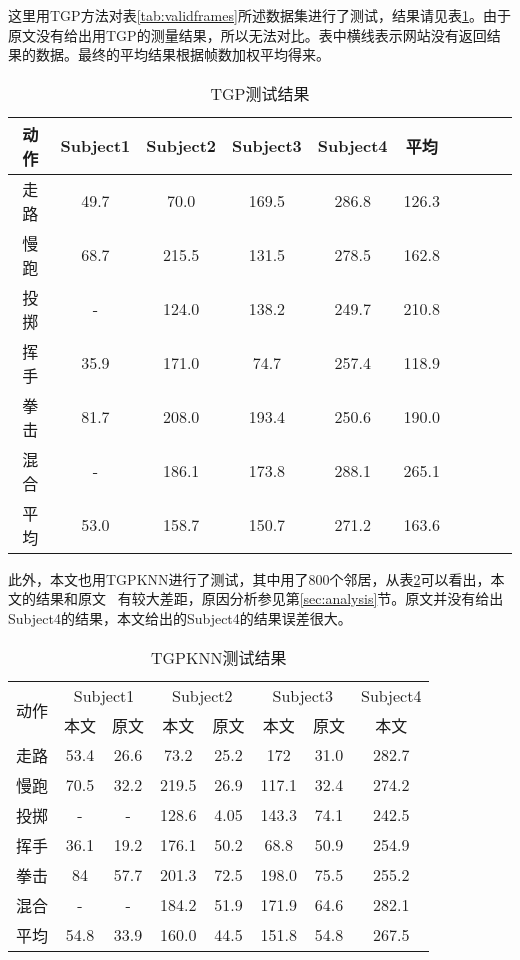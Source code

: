 这里用TGP方法对表\ref{tab:validframes}所述数据集进行了测试，结果请见表\ref{tab:TGPresult}。由于原文没有给出用TGP的测量结果，所以无法对比。表中横线表示网站没有返回结果的数据。最终的平均结果根据帧数加权平均得来。
\begin{table}[H]
  \centering
  \caption{TGP测试结果}
  \label{tab:TGPresult}
    \begin{tabular}{cccccccccc}
      \toprule[1.5pt]
      动作 & Subject1 & Subject2 & Subject3 & Subject4 & 平均 \\\midrule[1pt]
      走路 & 49.7& 70.0& 169.5& 286.8& 126.3\\
      慢跑 & 68.7& 215.5& 131.5& 278.5 & 162.8\\
      投掷 & - & 124.0& 138.2& 249.7 & 210.8\\
      挥手 & 35.9& 171.0& 74.7& 257.4 & 118.9\\
      拳击 & 81.7& 208.0& 193.4& 250.6 & 190.0\\
      混合 & - & 186.1 & 173.8& 288.1 & 265.1\\
      平均 & 53.0& 158.7& 150.7& 271.2& 163.6\\
      \bottomrule[1.5pt]
    \end{tabular}
\end{table}
此外，本文也用TGPKNN进行了测试，其中用了800个邻居，从表\ref{tab:TGPKNNresult}可以看出，本文的结果和原文~\cite{bo2010twin} 有较大差距，原因分析参见第\ref{sec:analysis}节。原文并没有给出Subject4的结果，本文给出的Subject4的结果误差很大。
\begin{table}[H]
  \centering
  \caption{TGPKNN测试结果}
  \label{tab:TGPKNNresult}
    \begin{tabular}{cccccccc}
      \toprule[1.5pt]
      \multirow{2}{2em}{动作} & \multicolumn{2}{c}{Subject1} & \multicolumn{2}{c}{Subject2} & \multicolumn{2}{c}{Subject3} & Subject4\\
      & 本文 & 原文 & 本文 & 原文 & 本文 & 原文 & 本文 \\\midrule[1pt]
      走路 & 53.4& 26.6& 73.2& 25.2& 172& 31.0& 282.7\\
      慢跑 & 70.5& 32.2& 219.5& 26.9& 117.1& 32.4& 274.2\\
      投掷 & -& -& 128.6& 4.05& 143.3& 74.1& 242.5\\
      挥手 & 36.1& 19.2& 176.1& 50.2& 68.8& 50.9& 254.9\\
      拳击 & 84& 57.7& 201.3& 72.5& 198.0& 75.5& 255.2\\
      混合 & -& -& 184.2& 51.9& 171.9& 64.6& 282.1\\
      平均 & 54.8& 33.9& 160.0& 44.5& 151.8& 54.8& 267.5\\
      \bottomrule[1.5pt]
    \end{tabular}
\end{table}


